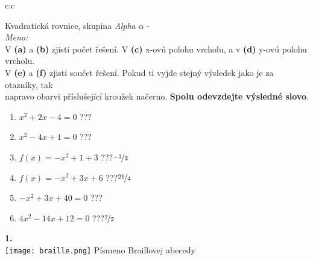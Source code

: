 \documentclass[10pt]{report}
\begin{document}
\thispagestyle{empty}
\begin{tabular}{c:c}
\begin{minipage}[c][99mm][t]{0.49\linewidth}
\begin{center}
\vspace{7mm}
{\huge Kvadratická rovnice, skupina \textit{Alpha $\alpha$} -}\\[4.5mm]
\textit{Meno:}\phantom{xxxxxxxxxxxxxxxxxxxxxxxxxxxxxxxxxxxxxxxxxxxxxxxxxxxxxxxxxxxxxxxxx}\\[3.5mm]
V \textbf{(a)} a \textbf{(b)} zjisti počet řešení. V \textbf{(c)} x-ovú polohu vrcholu, a v \textbf{(d)} y-ovú polohu vrcholu.\\V \textbf{(e)} a \textbf{(f)} zjisti součet řešení. Pokud ti vyjde stejný výsledek jako je za otazníky, tak\\napravo obarvi příslušející kroužek načerno. \textbf{Spolu odevzdejte výsledné slovo}.\\[3mm]
\begin{minipage}{0.77\linewidth}
\begin{center}
\begin{varwidth}{\textwidth}
\begin{enumerate}
\large
\item $x^2+2x-4=0$\quad \dotfill\; ???\;\dotfill {}
\item $x^2-4x+1=0$\quad \dotfill\; ???\;\dotfill {}
\item $f(x)=-x^2+1+3$\quad \dotfill\; ???\;\dotfill \quad $\nicefrac{-1}{2}$
\item $f(x)=-x^2+3x+6$\quad \dotfill\; ???\;\dotfill \quad $\nicefrac{21}{4}$
\item $-x^2+3x+40=0$\quad \dotfill\; ???\;\dotfill {}
\item $4x^2-14x+12=0$\quad \dotfill\; ???\;\dotfill \quad $\nicefrac{7}{2}$
\end{enumerate}
\end{varwidth}
\end{center}
\end{minipage}
\begin{minipage}{0.20\linewidth}
\begin{center}
{\Huge\bfseries 1.} \\[2mm]
\texttt{[image: braille.png]}
{\small Písmeno Braillovej abecedy}
\end{center}
\end{minipage}
\end{center}
\end{minipage}

\end{tabular}
\end{document}
